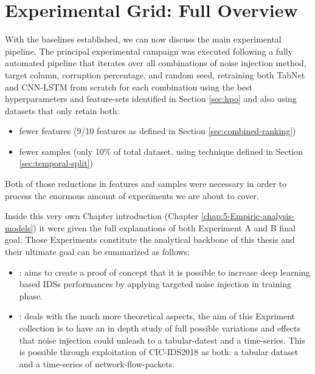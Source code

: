 \documentclass[../main.tex]{subfiles}
\begin{document}
\newpage
\section{Experimental Grid: Full Overview}
\label{sec:experiment-protocol}

With the baselines established, we can now discuss the main experimental pipeline. The principal experimental campaign was executed following a fully automated pipeline that iterates over all combinations of noise injection method, target column, corruption percentage, and random seed, retraining both TabNet and CNN-LSTM from scratch for each combination using the best hyperparameters and feature-sets identified in Section \ref{sec:hpo} and also using datasets that only retain both:
\begin{itemize}
    \item fewer features (9/10 features as defined in Section \ref{sec:combined-ranking})
    \item fewer samples (only 10\% of total dataset, using technique defined in Section \ref{sec:temporal-split})
\end{itemize}
Both of those reductions in features and samples were necessary in order to process the enormous amount of experiments we are about to cover.

Inside this very own Chapter introduction (Chapter \ref{chap:5-Empiric-analysis-models}) it were given the full explanations of both Experiment A and B final goal. Those Experiments constitute the analytical backbone of this thesis and their ultimate goal can be summarized as follows: 
\begin{itemize}
    \item {}: aims to create a proof of concept that it is possible to increase deep learning based IDSs performances by applying targeted noise injection in training phase. 
    \item {}: deals with the much more theoretical aspects, the aim of this Expriment collection is to have an in depth study of full possible variations and effects that noise injection could unleash to a tabular-datest and a time-series. This is possible through exploitation of CIC-IDS2018 as both: a tabular dataset and a time-series of network-flow-packets.
\end{itemize}
\end{document}
